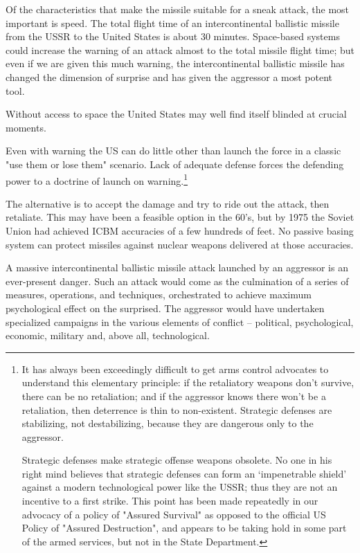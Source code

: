 Of the characteristics that make the missile suitable for a sneak attack, the most important is speed. The total flight time of an intercontinental ballistic missile from the USSR to the United States is about 30 minutes. Space-based systems could increase the warning of an attack almost to the total missile flight time; but even if we are given this much warning, the intercontinental ballistic missile has changed the dimension of surprise and has given the aggressor a most potent tool.

Without access to space the United States may well find itself blinded at crucial moments.

Even with warning the US can do little other than launch the force in a classic "use them or lose them" scenario. Lack of adequate defense forces the defending power to a doctrine of launch on warning.\footnote{It has always been exceedingly difficult to get arms control advocates to understand this elementary principle: if the retaliatory weapons don’t survive, there can be no retaliation; and if the aggressor knows there won’t be a retaliation, then deterrence is thin to non-existent. Strategic defenses are stabilizing, not destabilizing, because they are dangerous only to the aggressor.

Strategic defenses make strategic offense weapons obsolete. No one in his right mind believes that strategic defenses can form an ‘impenetrable shield’ against a modern technological power like the USSR; thus they are not an incentive to a first strike. This point has been made repeatedly in our advocacy of a policy of "Assured Survival" as opposed to the official US Policy of "Assured Destruction", and appears to be taking hold in some part of the armed services, but not in the State Department.}

\begin{mdframed}[backgroundcolor=black!10]
    The alternative is to accept the damage and try to ride out the attack, then retaliate. This may have been a feasible option in the 60's, but by 1975 the Soviet Union had achieved ICBM accuracies of a few hundreds of feet. No passive basing system can protect missiles against nuclear weapons delivered at those accuracies.
\end{mdframed}

A massive intercontinental ballistic missile attack launched by an aggressor is an ever-present danger. Such an attack would come as the culmination of a series of measures, operations, and techniques, orchestrated to achieve maximum psychological effect on the surprised. The aggressor would have undertaken specialized campaigns in the various elements of conflict -- political, psychological, economic, military and, above all, technological.

